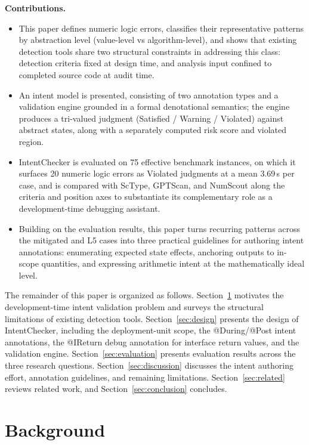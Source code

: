 \documentclass[pdflatex,sn-basic]{sn-jnl}%
\theoremstyle{thmstyleone}%
\theoremstyle{thmstyletwo}%
\theoremstyle{thmstylethree}%
\begin{document}
\smallskip
\noindent\textbf{Contributions.}
\begin{itemize}
    \item This paper defines numeric logic errors, classifies their representative patterns by abstraction level (value-level vs algorithm-level), and shows that existing detection tools share two structural constraints in addressing this class: detection criteria fixed at design time, and analysis input confined to completed source code at audit time.
    \item An intent model is presented, consisting of two annotation types and a validation engine grounded in a formal denotational semantics; the engine produces a tri-valued judgment (Satisfied / Warning / Violated) against abstract states, along with a separately computed risk score and violated region.
    \item IntentChecker is evaluated on 75 effective benchmark instances, on which it surfaces 20 numeric logic errors as Violated judgments at a mean 3.69\,s per case, and is compared with ScType, GPTScan, and NumScout along the criteria and position axes to substantiate its complementary role as a development-time debugging assistant.
    \item Building on the evaluation results, this paper turns recurring patterns across the mitigated and L5 cases into three practical guidelines for authoring intent annotations: enumerating expected state effects, anchoring outputs to in-scope quantities, and expressing arithmetic intent at the mathematically ideal level.
\end{itemize}

The remainder of this paper is organized as follows.
Section~\ref{sec:background} motivates the development-time intent validation problem and surveys the structural limitations of existing detection tools.
Section~\ref{sec:design} presents the design of IntentChecker, including the deployment-unit scope, the @During/@Post intent annotations, the @IReturn debug annotation for interface return values, and the validation engine.
Section~\ref{sec:evaluation} presents evaluation results across the three research questions.
Section~\ref{sec:discussion} discusses the intent authoring effort, annotation guidelines, and remaining limitations.
Section~\ref{sec:related} reviews related work, and Section~\ref{sec:conclusion} concludes.

\section{Background}\label{sec:background}
\end{document}
